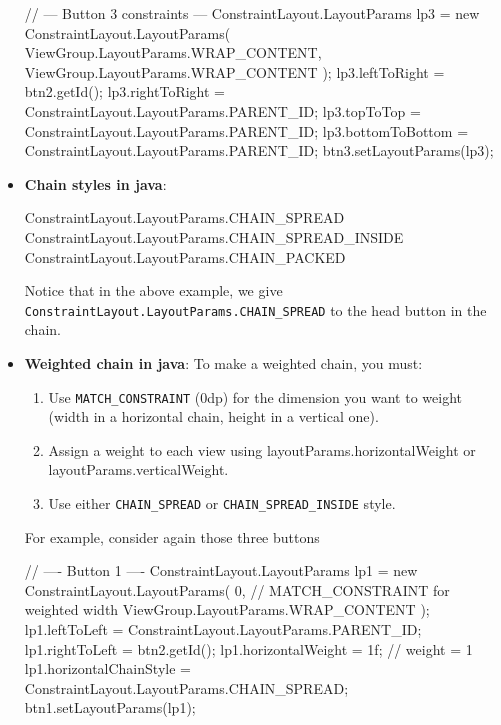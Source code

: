 \documentclass{report}
\begin{document}
\begin{itemize}
\begin{javacode}
                // --- Button 3 constraints ---
                ConstraintLayout.LayoutParams lp3 = new ConstraintLayout.LayoutParams(
                        ViewGroup.LayoutParams.WRAP_CONTENT,
                        ViewGroup.LayoutParams.WRAP_CONTENT
                );
                lp3.leftToRight = btn2.getId();
                lp3.rightToRight = ConstraintLayout.LayoutParams.PARENT_ID;
                lp3.topToTop = ConstraintLayout.LayoutParams.PARENT_ID;
                lp3.bottomToBottom = ConstraintLayout.LayoutParams.PARENT_ID;
                btn3.setLayoutParams(lp3);
            \end{javacode}
        \item \textbf{Chain styles in java}:
            \bigbreak \noindent 
            \begin{javacode}
                ConstraintLayout.LayoutParams.CHAIN_SPREAD
                ConstraintLayout.LayoutParams.CHAIN_SPREAD_INSIDE
                ConstraintLayout.LayoutParams.CHAIN_PACKED
            \end{javacode}
            \bigbreak \noindent 
            Notice that in the above example, we give \texttt{ConstraintLayout.LayoutParams.CHAIN\_SPREAD} to the head button in the chain.
        \item \textbf{Weighted chain in java}: To make a weighted chain, you must:
            \begin{enumerate}
                \item Use \texttt{MATCH\_CONSTRAINT} (0dp) for the dimension you want to weight (width in a horizontal chain, height in a vertical one).
                \item Assign a weight to each view using layoutParams.horizontalWeight or layoutParams.verticalWeight.
                \item Use either \texttt{CHAIN\_SPREAD} or \texttt{CHAIN\_SPREAD\_INSIDE} style.
            \end{enumerate}
            \bigbreak \noindent 
            For example, consider again those three buttons
            \bigbreak \noindent 
            \begin{javacode}
                // ---- Button 1 ----
                ConstraintLayout.LayoutParams lp1 = new ConstraintLayout.LayoutParams(
                        0,  // MATCH_CONSTRAINT for weighted width
                        ViewGroup.LayoutParams.WRAP_CONTENT
                );
                lp1.leftToLeft = ConstraintLayout.LayoutParams.PARENT_ID;
                lp1.rightToLeft = btn2.getId();
                lp1.horizontalWeight = 1f; // weight = 1
                lp1.horizontalChainStyle = ConstraintLayout.LayoutParams.CHAIN_SPREAD;
                btn1.setLayoutParams(lp1);


\end{javacode}
\end{itemize}
\end{document}
